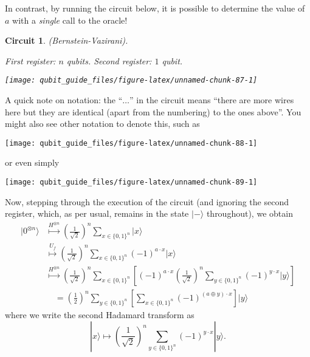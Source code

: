 \documentclass[fleqn]{article}
\newtheorem*{circuit}{Circuit}
\begin{document}
In contrast, by running the circuit below, it is possible to determine the value of \(a\) with a \emph{single} call to the oracle!

\begin{circuit}

(Bernstein-Vazirani).

\emph{First register: \(n\) qubits. Second register: \(1\) qubit.}

\begin{center}\texttt{[image: qubit\_guide\_files/figure-latex/unnamed-chunk-87-1]} \end{center}

\end{circuit}

A quick note on notation: the ``\(\ldots\)'' in the circuit means ``there are more wires here but they are identical (apart from the numbering) to the ones above''.
You might also see other notation to denote this, such as

\begin{center}\texttt{[image: qubit\_guide\_files/figure-latex/unnamed-chunk-88-1]} \end{center}

or even simply

\begin{center}\texttt{[image: qubit\_guide\_files/figure-latex/unnamed-chunk-89-1]} \end{center}

Now, stepping through the execution of the circuit (and ignoring the second register, which, as per usual, remains in the state \(|-\rangle\) throughout), we obtain
\[
  \begin{aligned}
    |0^{\otimes n}\rangle
    &\overset{H^{\otimes n}}{\longmapsto}
    \left(\frac{1}{\sqrt{2}}\right)^n \sum_{x\in\{0,1\}^n} |x\rangle
  \\&\overset{U_f}{\longmapsto}
    \left(\frac{1}{\sqrt{2}}\right)^n \sum_{x\in\{0,1\}^n} (-1)^{a\cdot x}|x\rangle
  \\&\overset{H^{\otimes n}}{\longmapsto}
    \left(\frac{1}{\sqrt{2}}\right)^n \sum_{x\in\{0,1\}^n}
    \left[
      (-1)^{a\cdot x} \left(\frac{1}{\sqrt{2}}\right)^n
      \sum_{y\in\{0,1\}^n} (-1)^{y\cdot x} |y\rangle
    \right]
  \\&\quad= \left(\frac{1}{2}\right)^n \sum_{y\in\{0,1\}^n}
    \left[
      \sum_{x\in\{0,1\}^n} (-1)^{(a\oplus y)\cdot x}
    \right]
    |y\rangle
  \end{aligned}
\]
where we write the second Hadamard transform as
\[
  |x\rangle
  \longmapsto
  \left(\frac{1}{\sqrt{2}}\right)^n \sum_{y\in\{0,1\}^n} (-1)^{y\cdot x}|y\rangle.
\]
\end{document}
